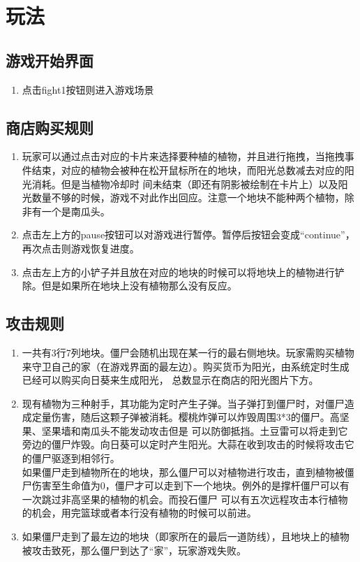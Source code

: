 \documentclass[12pt,a4paper,UTF8]{article}
\begin{document}
\section{玩法}
  \subsection{游戏开始界面}
  \begin{enumerate}
    \item 点击fight1按钮则进入游戏场景
  \end{enumerate}
  
  \subsection{商店购买规则}
  \begin{enumerate}
      \item 玩家可以通过点击对应的卡片来选择要种植的植物，并且进行拖拽，当拖拽事件结束，对应的植物会被种在松开鼠标所在的地块，而阳光总数减去对应的阳光消耗。但是当植物冷却时
      间未结束（即还有阴影被绘制在卡片上）以及阳光数量不够的时候，游戏不对此作出回应。注意一个地块不能种两个植物，除非有一个是南瓜头。
      \item 点击左上方的pause按钮可以对游戏进行暂停。暂停后按钮会变成“continue”，再次点击则游戏恢复进度。
      \item 点击左上方的小铲子并且放在对应的地块的时候可以将地块上的植物进行铲除。但是如果所在地块上没有植物那么没有反应。
  \end{enumerate}

  \subsection{攻击规则}
  \begin{enumerate}
    \item 一共有3行7列地块。僵尸会随机出现在某一行的最右侧地块。玩家需购买植物来守卫自己的家（在游戏界面的最左边）。购买货币为阳光，由系统定时生成已经可以购买向日葵来生成阳光，
    总数显示在商店的阳光图片下方。
    \item 现有植物为三种射手，其功能为定时产生子弹。当子弹打到僵尸时，对僵尸造成定量伤害，随后这颗子弹被消耗。樱桃炸弹可以炸毁周围3*3的僵尸。高坚果、坚果墙和南瓜头不能发动攻击但是
    可以防御抵挡。土豆雷可以将走到它旁边的僵尸炸毁。向日葵可以定时产生阳光。大蒜在收到攻击的时候将攻击它的僵尸驱逐到相邻行。\\
    如果僵尸走到植物所在的地块，那么僵尸可以对植物进行攻击，直到植物被僵尸伤害至生命值为0，僵尸才可以走到下一个地块。例外的是撑杆僵尸可以有一次跳过非高坚果的植物的机会。而投石僵尸
    可以有五次远程攻击本行植物的机会，用完篮球或者本行没有植物的时候可以前进。
    \item 如果僵尸走到了最左边的地块（即家所在的最后一道防线），且地块上的植物被攻击致死，那么僵尸到达了“家”，玩家游戏失败。
  \end{enumerate}
\end{document}
